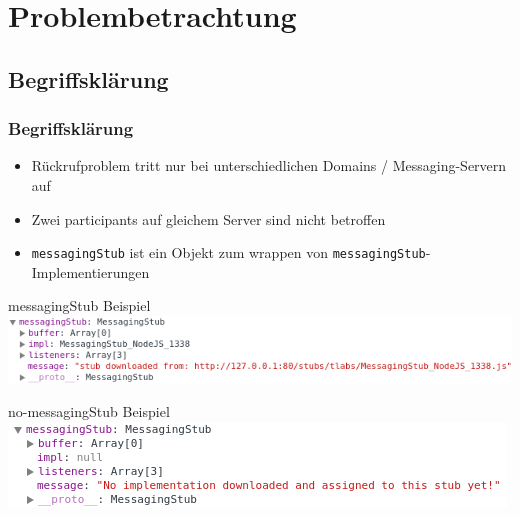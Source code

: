 \documentclass{beamer}
\begin{document}

\section{Problembetrachtung}
\subsection{Begriffsklärung}
\begin{frame}
	\frametitle{Begriffsklärung}
	\begin{itemize}
		\item Rückrufproblem tritt nur bei unterschiedlichen Domains / Messaging-Servern auf
		\item Zwei participants auf gleichem Server sind nicht betroffen
		\item \texttt{messagingStub} ist ein Objekt zum wrappen von \texttt{messagingStub}-Implementierungen
	\end{itemize}
	\begin{exampleblock}{messagingStub Beispiel}
		\includegraphics[scale=0.47,centered]{pictures/messagingStub}
	\end{exampleblock}
	\begin{exampleblock}{no-messagingStub Beispiel}
		\includegraphics[scale=0.47,centered]{pictures/nomsgstub}
	\end{exampleblock}
\end{frame}
\end{document}
